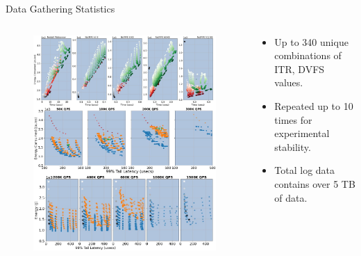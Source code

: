 \documentclass[notes=only,10pt,xcolor=table]{beamer}
\begin{document}
\begin{frame}{Data Gathering Statistics}
\begin{columns}
    \begin{column}{.5\textwidth}
        \begin{figure}
            \includegraphics[width=1\textwidth]{img/data_collage.pdf}
        \end{figure}
    \end{column}
    \begin{column}{.5\textwidth}
        \begin{itemize}
            \item Up to 340 unique combinations of ITR, DVFS values.
            \item Repeated up to 10 times for experimental stability.
            \item Total log data contains over 5 TB of data.
        \end{itemize}
    \end{column}
\end{columns}    
\end{frame}
\end{document}
